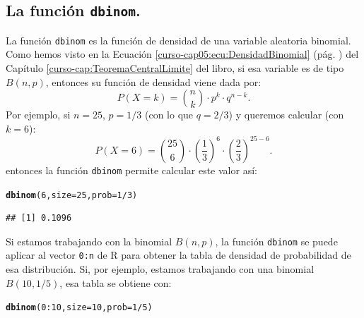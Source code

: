 \documentclass[10pt,a4paper]{article}\usepackage[]{graphicx}\usepackage[]{color}
\makeatletter
\newcommand{\hlnum}[1]{\textcolor[rgb]{0.686,0.059,0.569}{#1}}%
\newcommand{\hlopt}[1]{\textcolor[rgb]{0,0,0}{#1}}%
\newcommand{\hlstd}[1]{\textcolor[rgb]{0.345,0.345,0.345}{#1}}%
\newcommand{\hlkwc}[1]{\textcolor[rgb]{0.333,0.667,0.333}{#1}}%
\newcommand{\hlkwd}[1]{\textcolor[rgb]{0.737,0.353,0.396}{\textbf{#1}}}%
\newenvironment{kframe}{%
 \def\at@end@of@kframe{}%
 \ifinner\ifhmode%
  \def\at@end@of@kframe{\end{minipage}}%
  \begin{minipage}{\columnwidth}%
 \fi\fi%
 \def\FrameCommand##1{\hskip\@totalleftmargin \hskip-\fboxsep
 \colorbox{shadecolor}{##1}\hskip-\fboxsep
     \hskip-\linewidth \hskip-\@totalleftmargin \hskip\columnwidth}%
 \MakeFramed {\advance\hsize-\width
   \@totalleftmargin\z@ \linewidth\hsize
   \@setminipage}}%
 {\par\unskip\endMakeFramed%
 \at@end@of@kframe}
\newenvironment{knitrout}{}{} %
\makeatother
\begin{document}
\subsection{La función {\tt dbinom}.}
\label{tut05:subsec:FuncionDbinom}

La función {\tt dbinom} es la función de densidad de una variable aleatoria binomial. Como hemos visto en la Ecuación \ref{curso-cap05:ecu:DensidadBinomial} (pág. \pageref{curso-cap05:ecu:DensidadBinomial}) del Capítulo \ref{curso-cap:TeoremaCentralLimite} del libro, si esa variable es de tipo $B(n,p)$, entonces su función de densidad viene dada por:
\[\displaystyle P(X=k)=\binom{n}{k}\cdot p^k\cdot q^{n-k}.\]
Por ejemplo, si $n=25$, $p=1/3$ (con lo que $q=2/3$) y queremos calcular (con $k=6$):
\[\displaystyle P(X=6)=\binom{25}{6}\cdot \left(\dfrac{1}{3}\right)^6\cdot \left(\dfrac{2}{3}\right)^{25-6}.\]
entonces la función {\tt dbinom} permite calcular este valor así:
\begin{knitrout}
\color{fgcolor}\begin{kframe}
\begin{alltt}
\hlkwd{dbinom}\hlstd{(}\hlnum{6}\hlstd{,} \hlkwc{size}\hlstd{=} \hlnum{25}\hlstd{,} \hlkwc{prob}\hlstd{=}\hlnum{1}\hlopt{/}\hlnum{3}\hlstd{)}
\end{alltt}
\begin{verbatim}
## [1] 0.1096
\end{verbatim}
\end{kframe}
\end{knitrout}

Si estamos trabajando con la binomial $B(n,p)$, la función {\tt dbinom} se puede aplicar al vector {\tt 0:n} de R para obtener la tabla de densidad de probabilidad de esa distribución. Si, por ejemplo, estamos trabajando con una binomial $B(10,1/5)$, esa tabla se obtiene con:
\begin{knitrout}
\color{fgcolor}\begin{kframe}
\begin{alltt}
\hlkwd{dbinom}\hlstd{(}\hlnum{0}\hlopt{:}\hlnum{10}\hlstd{,} \hlkwc{size}\hlstd{=} \hlnum{10}\hlstd{,} \hlkwc{prob}\hlstd{=}\hlnum{1}\hlopt{/}\hlnum{5}\hlstd{)}
\end{alltt}
\end{kframe}
\end{knitrout}
\end{document}
